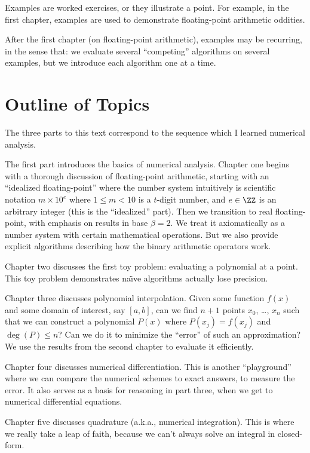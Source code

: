 Examples are worked exercises, or they illustrate a point. For example,
in the first chapter, examples are used to demonstrate floating-point
arithmetic oddities.

After the first chapter (on floating-point arithmetic), examples may be
recurring, in the sense that: we evaluate several ``competing''
algorithms on several examples, but we introduce each algorithm one at a
time.

\section*{Outline of Topics}

The three parts to this text correspond to the sequence which I learned
numerical analysis.

The first part introduces the basics of numerical analysis. Chapter one begins
with a thorough discussion of floating-point arithmetic, starting with
an ``idealized floating-point'' where the number system intuitively
is scientific notation $m\times 10^{e}$ where $1\leq m<10$ is a
$t$-digit number, and $e\in\ZZ$ is an arbitrary integer (this is the
``idealized'' part). Then we transition to real 
floating-point, with emphasis on results in base $\beta=2$. We treat it
axiomatically as a number system with certain mathematical
operations. But we also provide explicit algorithms describing how the
binary arithmetic operators work.

Chapter two discusses the first toy problem: evaluating a polynomial at
a point. This toy problem demonstrates na\"{\i}ve algorithms actually
lose precision.

Chapter three discusses polynomial interpolation. Given some function
$f(x)$ and some domain of interest, say $[a,b]$, can we find $n+1$ points
$x_{0}$, \dots, $x_{n}$ such that we can construct a polynomial $P(x)$
where $P(x_{j})=f(x_{j})$ and $\deg(P)\leq n$? Can we do it to minimize
the ``error'' of such an approximation? We use the results from the
second chapter to evaluate it efficiently.

Chapter four discusses numerical differentiation. This is another
``playground'' where we can compare the numerical schemes to exact
answers, to measure the error. It also serves as a basis for reasoning
in part three, when we get to numerical differential equations.

Chapter five discusses quadrature (a.k.a., numerical integration).
This is where we really take a leap of faith, because we can't always
solve an integral in closed-form.

